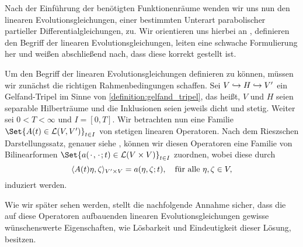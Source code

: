 \documentclass[../main.tex]{subfiles}
\begin{document}
Nach der Einführung der benötigten Funktionenräume wenden wir uns nun den linearen Evolutionsgleichungen, einer bestimmten Unterart parabolischer partieller Differentialgleichungen, zu.
Wir orientieren uns hierbei an \textcite{Lions:1971wp,Schwab:2009ec,Urban:2014kg},
definieren den Begriff der linearen Evolutionsgleichungen, leiten eine schwache Formulierung her und weißen abschließend nach, dass diese korrekt gestellt ist.

Um den Begriff der linearen Evolutionsgleichungen definieren zu können, müssen wir zunächst die richtigen Rahmenbedingungen schaffen.
Sei $V \denseinclusion H \denseinclusion V'$ ein Gelfand-Tripel im Sinne von \cref{definition:gelfand_tripel}, das heißt, $V$ und $H$ seien separable Hilberträume und die Inklusionen seien jeweils dicht und stetig.
Weiter sei $0 < T < \infty$ und $I = [0, T]$.
Wir betrachten nun eine Familie $\Set{A(t) \in \mathcal L(V, V')}_{t \in I}$ von stetigen linearen Operatoren.
Nach dem Rieszschen Darstellungssatz, genauer siehe \cite[Theorem \S{}22.1]{Halmos:1957vd}, können wir diesen Operatoren eine Familie von Bilinearformen $\Set{a(\blank, \blank; t) \in \mathcal L(V \times V)}_{t \in I}$ zuordnen, wobei diese durch
\begin{equation}
    \skp{A(t)\eta}{\zeta}{V' \times V} = a(\eta, \zeta; t), \quad \fa \eta, \zeta \in V,
\end{equation}
induziert werden.

Wie wir später sehen werden, stellt die nachfolgende Annahme sicher, dass die auf diese Operatoren aufbauenden linearen Evolutionsgleichungen gewisse wünschenswerte Eigenschaften, wie Lösbarkeit und Eindeutigkeit dieser Lösung, besitzen.
\end{document}
